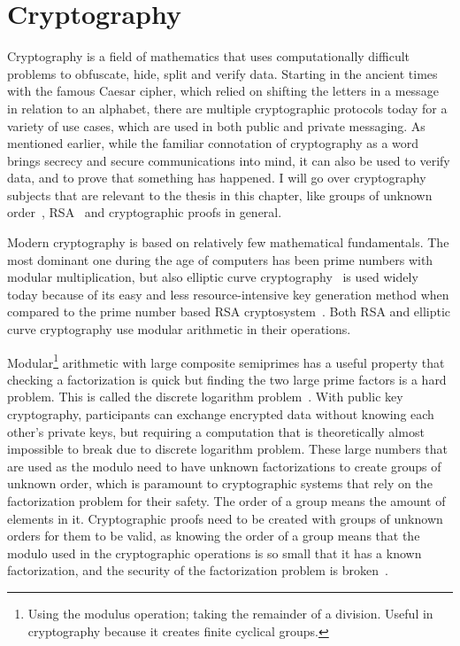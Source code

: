 \section{Cryptography}

Cryptography is a field of mathematics that uses computationally difficult problems to obfuscate, hide, split and verify data. Starting in the ancient times with the famous Caesar cipher, which relied on shifting the letters in a message in relation to an alphabet, there are multiple cryptographic protocols today for a variety of use cases, which are used in both public and private messaging. As mentioned earlier, while the familiar connotation of cryptography as a word brings secrecy and secure communications into mind, it can also be used to verify data, and to prove that something has happened. I will go over cryptography subjects that are relevant to the thesis in this chapter, like groups of unknown order~\cite{Richard2000-zp}, RSA~\cite{Rivest1978-fm} and cryptographic proofs in general.

Modern cryptography is based on relatively few mathematical fundamentals. The most dominant one during the age of computers has been prime numbers with modular multiplication, but also elliptic curve cryptography~\cite{Koblitz1987-vf, Miller1986-be} is used widely today because of its easy and less resource-intensive key generation method when compared to the prime number based RSA cryptosystem~\cite{noauthor_undated-hj}. Both RSA and elliptic curve cryptography use modular arithmetic in their operations.

Modular\footnote{Using the modulus operation; taking the remainder of a division. Useful in cryptography because it creates finite cyclical groups.} arithmetic with large composite semiprimes has a useful property that checking a factorization is quick but finding the two large prime factors is a hard problem. This is called the discrete logarithm problem~\cite{Joux2014-rz}. With public key cryptography, participants can exchange encrypted data without knowing each other's private keys, but requiring a computation that is theoretically almost impossible to break due to discrete logarithm problem. These large numbers that are used as the modulo need to have unknown factorizations to create groups of unknown order, which is paramount to cryptographic systems that rely on the factorization problem for their safety. The order of a group means the amount of elements in it. Cryptographic proofs need to be created with groups of unknown orders for them to be valid, as knowing the order of a group means that the modulo used in the cryptographic operations is so small that it has a known factorization, and the security of the factorization problem is broken~\cite{Dobson_undated-aw}.


